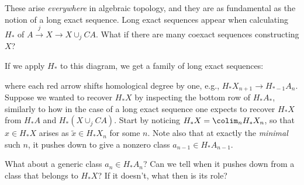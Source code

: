 These arise \emph{everywhere} in algebraic topology, and they are as fundamental as the notion of a long exact sequence.  Long exact sequences appear when calculating $H_*$ of $A \xrightarrow j X \to X \cup_j CA$.  What if there are many coexact sequences constructing $X$?

\begin{center}
\end{center}

If we apply $H_*$ to this diagram, we get a family of long exact sequences:
\begin{center}
\end{center}
where each red arrow shifts homological degree by one, e.g., $H_* X_{n+1} \to H_{*-1} A_n$.  Suppose we wanted to recover $H_* X$ by inspecting the bottom row of $H_* A_*$, similarly to how in the case of a long exact sequence one expects to recover $H_* X$ from $H_* A$ and $H_*(X \cup_j CA)$.  Start by noticing $H_* X = \colim_n H_* X_n$, so that $x \in H_* X$ arises as $\widetilde x \in H_* X_n$ for some $n$.  Note also that at exactly the \emph{minimal} such $n$, it pushes down to give a nonzero class $a_{n-1} \in H_* A_{n-1}$.

What about a generic class $a_n \in H_* A_n$?  Can we tell when it pushes down from a class that belongs to $H_* X$?  If it doesn't, what then is its role?

\begin{center}
\end{center}

